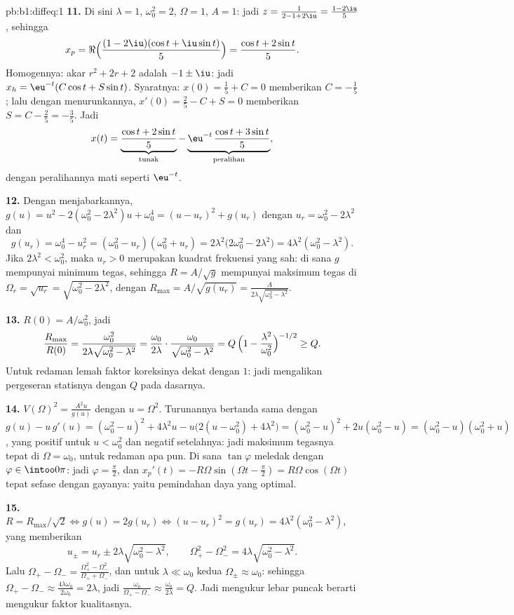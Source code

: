 \begin{solution}{pb:b1:diffeq:1}
\textbf{11.} Di sini $\lambda = 1$, $\omega_0^2 = 2$, $\Omega = 1$,
$A = 1$: jadi $z = \frac1{2 - 1 + 2\iu} = \frac{1 - 2\iu}5$, sehingga
\[
x_p = \Re\Bigl(\frac{(1 - 2\iu)(\cos t + \iu\sin t)}5\Bigr)
= \frac{\cos t + 2\sin t}5 .
\]
Homogennya: akar $r^2 + 2r + 2$ adalah $-1 \pm \iu$: jadi $x_h =
\eu^{-t}(C\cos t + S\sin t)$. Syaratnya: $x(0) = \frac15 + C = 0$
memberikan $C = -\frac15$; lalu dengan menurunkannya, $x'(0) = \frac25 - C + S =
0$ memberikan $S = C - \frac25 = -\frac35$. Jadi
\[
x(t) = \underbrace{\frac{\cos t + 2\sin t}5}_{\text{tunak}}
- \underbrace{\eu^{-t}\,\frac{\cos t + 3\sin
t}5}_{\text{peralihan}} ,
\]
dengan peralihannya mati seperti $\eu^{-t}$.

\textbf{12.} Dengan menjabarkannya, $g(u) = u^2 - 2(\omega_0^2 - 2\lambda^2)u
+ \omega_0^4 = (u - u_r)^2 + g(u_r)$ dengan $u_r = \omega_0^2 -
2\lambda^2$ dan
\[
g(u_r) = \omega_0^4 - u_r^2 = (\omega_0^2 - u_r)(\omega_0^2 +
u_r) = 2\lambda^2\bigl(2\omega_0^2 - 2\lambda^2\bigr) =
4\lambda^2(\omega_0^2 - \lambda^2) .
\]
Jika $2\lambda^2 < \omega_0^2$, maka $u_r > 0$ merupakan kuadrat
frekuensi yang sah: di sana $g$ mempunyai minimum tegas, sehingga $R = A/\sqrt
g$ mempunyai maksimum tegas di $\Omega_r = \sqrt{u_r} =
\sqrt{\omega_0^2 - 2\lambda^2}$, dengan $R_{\max} = A/\sqrt{g(u_r)}
= \frac{A}{2\lambda\sqrt{\omega_0^2 - \lambda^2}}$.

\textbf{13.} $R(0) = A/\omega_0^2$, jadi
\[
\frac{R_{\max}}{R(0)}
= \frac{\omega_0^2}{2\lambda\sqrt{\omega_0^2 - \lambda^2}}
= \frac{\omega_0}{2\lambda}\cdot
\frac{\omega_0}{\sqrt{\omega_0^2 - \lambda^2}}
= Q\,\Bigl(1 - \frac{\lambda^2}{\omega_0^2}\Bigr)^{-1/2}
\geq Q .
\]
Untuk redaman lemah faktor koreksinya dekat dengan $1$: jadi 
mengalikan pergeseran statisnya dengan $Q$ pada dasarnya.

\textbf{14.} $V(\Omega)^2 = \frac{A^2 u}{g(u)}$ dengan $u =
\Omega^2$. Turunannya bertanda sama dengan $g(u) - u\,g'(u) =
(\omega_0^2 - u)^2 + 4\lambda^2 u - u\bigl(2(u - \omega_0^2) +
4\lambda^2\bigr) = (\omega_0^2 - u)^2 + 2u(\omega_0^2 - u) =
(\omega_0^2 - u)(\omega_0^2 + u)$, yang positif untuk $u < \omega_0^2$
dan negatif setelahnya: jadi maksimum tegasnya tepat di $\Omega =
\omega_0$, untuk redaman apa pun. Di sana $\tan\varphi$ meledak dengan
$\varphi \in \intoo0\pi$: jadi $\varphi = \frac\pi2$, dan $x_p'(t) =
-R\Omega\sin(\Omega t - \frac\pi2) = R\Omega\cos(\Omega t)$ tepat
sefase dengan gayanya: yaitu pemindahan daya yang optimal.

\textbf{15.} $R = R_{\max}/\sqrt2 \iff g(u) = 2g(u_r) \iff (u -
u_r)^2 = g(u_r) = 4\lambda^2(\omega_0^2 - \lambda^2)$, yang memberikan
\[
u_\pm = u_r \pm 2\lambda\sqrt{\omega_0^2 - \lambda^2},
\qquad
\Omega_+^2 - \Omega_-^2 = 4\lambda\sqrt{\omega_0^2 - \lambda^2} .
\]
Lalu $\Omega_+ - \Omega_- = \frac{\Omega_+^2 -
\Omega_-^2}{\Omega_+ + \Omega_-}$, dan untuk $\lambda \ll \omega_0$
kedua $\Omega_\pm \approx \omega_0$: sehingga $\Omega_+ - \Omega_- \approx
\frac{4\lambda\omega_0}{2\omega_0} = 2\lambda$, jadi
$\frac{\omega_0}{\Omega_+ - \Omega_-} \approx
\frac{\omega_0}{2\lambda} = Q$. Jadi mengukur lebar puncak 
berarti mengukur faktor kualitasnya.


\end{solution}
